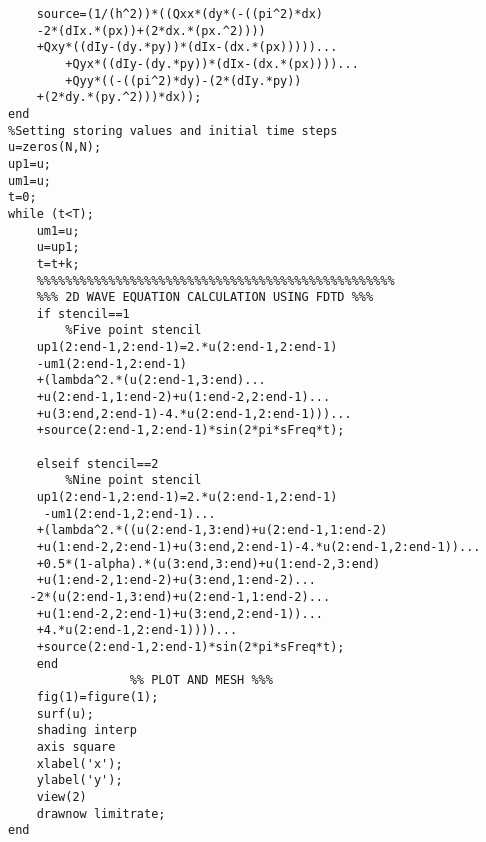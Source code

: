 \begin{lstlisting}
    source=(1/(h^2))*((Qxx*(dy*(-((pi^2)*dx)
	-2*(dIx.*(px))+(2*dx.*(px.^2))))
	+Qxy*((dIy-(dy.*py))*(dIx-(dx.*(px)))))...
        +Qyx*((dIy-(dy.*py))*(dIx-(dx.*(px))))...
        +Qyy*((-((pi^2)*dy)-(2*(dIy.*py)) 
	+(2*dy.*(py.^2)))*dx));
end
%Setting storing values and initial time steps
u=zeros(N,N);
up1=u;
um1=u;
t=0;
while (t<T);
    um1=u;
    u=up1;
    t=t+k;
    %%%%%%%%%%%%%%%%%%%%%%%%%%%%%%%%%%%%%%%%%%%%%%%%%%
    %%% 2D WAVE EQUATION CALCULATION USING FDTD %%%
    if stencil==1 
        %Five point stencil
    up1(2:end-1,2:end-1)=2.*u(2:end-1,2:end-1)
    -um1(2:end-1,2:end-1)
    +(lambda^2.*(u(2:end-1,3:end)...
    +u(2:end-1,1:end-2)+u(1:end-2,2:end-1)...
    +u(3:end,2:end-1)-4.*u(2:end-1,2:end-1)))...
    +source(2:end-1,2:end-1)*sin(2*pi*sFreq*t);

    elseif stencil==2
        %Nine point stencil
    up1(2:end-1,2:end-1)=2.*u(2:end-1,2:end-1)
     -um1(2:end-1,2:end-1)...
    +(lambda^2.*((u(2:end-1,3:end)+u(2:end-1,1:end-2)
    +u(1:end-2,2:end-1)+u(3:end,2:end-1)-4.*u(2:end-1,2:end-1))...
    +0.5*(1-alpha).*(u(3:end,3:end)+u(1:end-2,3:end)
    +u(1:end-2,1:end-2)+u(3:end,1:end-2)...
   -2*(u(2:end-1,3:end)+u(2:end-1,1:end-2)...
    +u(1:end-2,2:end-1)+u(3:end,2:end-1))...
    +4.*u(2:end-1,2:end-1))))...
    +source(2:end-1,2:end-1)*sin(2*pi*sFreq*t);
    end
                 %% PLOT AND MESH %%%
    fig(1)=figure(1);
    surf(u); 
    shading interp
    axis square
    xlabel('x');
    ylabel('y');
    view(2)
    drawnow limitrate;
end
\end{lstlisting}

